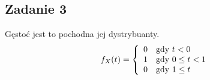\subsection{Zadanie 3}

Gęstoć jest to pochodna jej dystrybuanty.
$$
f_X(t)
 = \left\{ \begin{array}{ll}
0 & \textrm{gdy $t < 0$}\\
1 & \textrm{gdy $ 0 \leq t < 1 $}\\
0 & \textrm{gdy $1 \leq t$}
\end{array} \right.
$$
